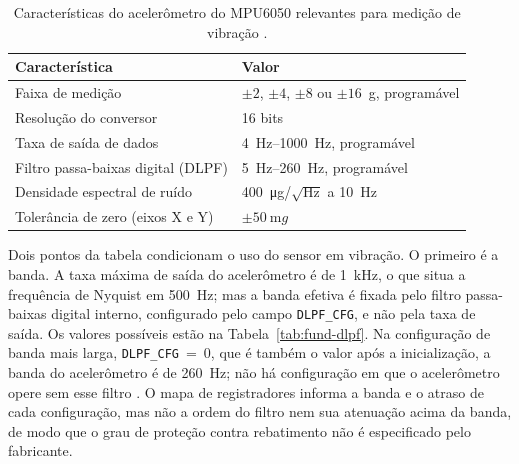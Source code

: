 \begin{table}[!htb]
\centering
\caption{Características do acelerômetro do MPU6050 relevantes para medição de vibração
\cite{invensense2011ps,invensense2012rm}.}
\label{tab:fund-mpu6050}
\small
\begin{tabular}{@{}ll@{}}
\toprule
Característica & Valor \\
\midrule
Faixa de medição                         & $\pm2$, $\pm4$, $\pm8$ ou $\pm16$~g, programável \\
Resolução do conversor                   & \num{16} bits \\
Taxa de saída de dados                   & \SIrange{4}{1000}{\hertz}, programável \\
Filtro passa-baixas digital (DLPF)       & \SIrange{5}{260}{\hertz}, programável \\
Densidade espectral de ruído             & \SI{400}{\micro g}/$\sqrt{\si{\hertz}}$ a \SI{10}{\hertz} \\
Tolerância de zero (eixos X e Y)         & $\pm\SI{50}{\milli g}$ \\
\bottomrule
\end{tabular}
\end{table}

Dois pontos da tabela condicionam o uso do sensor em vibração. O primeiro é a banda. A taxa
máxima de saída do acelerômetro é de \SI{1}{\kilo\hertz}, o que situa a frequência de
Nyquist em \SI{500}{\hertz}; mas a banda efetiva é fixada pelo filtro passa-baixas digital
interno, configurado pelo campo \texttt{DLPF\_CFG}, e não pela taxa de saída. Os valores
possíveis estão na Tabela~\ref{tab:fund-dlpf}. Na configuração de banda mais larga,
\texttt{DLPF\_CFG}~=~0, que é também o valor após a inicialização, a banda do acelerômetro
é de \SI{260}{\hertz}; não há configuração em que o acelerômetro opere sem esse filtro
\cite{invensense2012rm}. O mapa de registradores informa a banda e o atraso de cada
configuração, mas não a ordem do filtro nem sua atenuação acima da banda, de modo que o
grau de proteção contra rebatimento não é especificado pelo fabricante.

